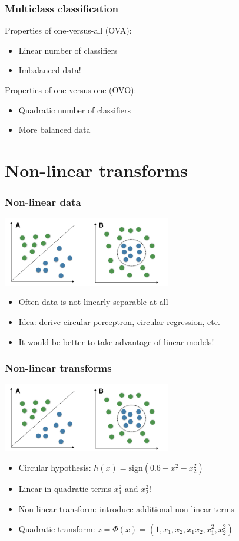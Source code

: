 \documentclass[10pt]{beamer}
\begin{document}
\begin{frame}
  \frametitle{Multiclass classification}
  Properties of one-versus-all (OVA):
  \begin{itemize}
	\item Linear number of classifiers
	\item Imbalanced data!
  \end{itemize}
  Properties of one-versus-one (OVO):
  \begin{itemize}
	\item Quadratic number of classifiers
	\item More balanced data
  \end{itemize}
\end{frame}

\section{Non-linear transforms}

\begin{frame}
  \frametitle{Non-linear data}
  \begin{center}
  \includegraphics[height=3cm]{images/circular.png}
  \end{center}
  \begin{itemize}
	\item Often data is not linearly separable at all
	\item {\color{red} Idea}: derive {\color{blue} circular} perceptron, {\color{blue} circular} regression, etc.
	\item It would be better to take advantage of linear models!
  \end{itemize}
\end{frame}

\begin{frame}
  \frametitle{Non-linear transforms}
  \begin{center}
  \includegraphics[height=3cm]{images/circular.png}
  \end{center}
  \begin{itemize}
	\item Circular hypothesis: $h(x)=\mathrm{sign}(0.6-x_1^2-x_2^2)$
	\item Linear in {\color{red} quadratic terms} $x_1^2$ and $x_2^2$!
	\item Non-linear transform: introduce additional {\color{blue} non-linear terms}
	\item Quadratic transform: $z=\Phi(x)=(1,x_1,x_2,x_1x_2,x_1^2,x_2^2)$
  \end{itemize}
\end{frame}
\end{document}
